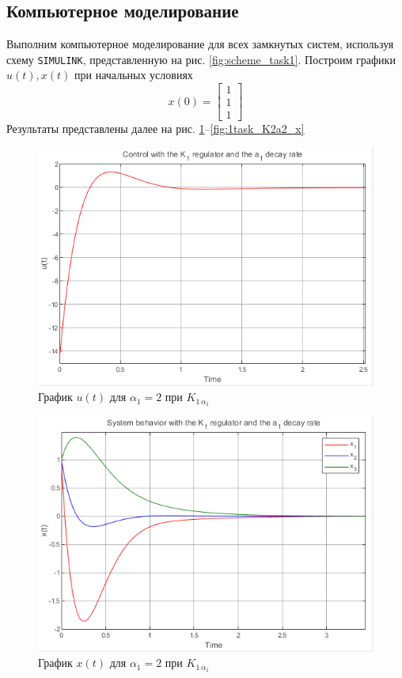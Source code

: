 \documentclass[a4paper, 12pt]{article}
\begin{document}
    \subsection{Компьютерное моделирование}
    Выполним компьютерное моделирование для всех замкнутых систем, используя схему \texttt{SIMULINK},
    представленную на рис. \ref{fig:scheme_task1}. Построим графики $u(t),x(t)$ при начальных условиях
    $$x(0)=\begin{bmatrix}
        1 \\1 \\1
    \end{bmatrix}$$
    Результаты представлены далее на рис. \ref{fig:1task_K1a1_u}--\ref{fig:1task_K2a2_x}
    \newpage
    \vspace*{0.01mm}
    \begin{figure}[H]
        \centering
        \includegraphics{1task_K1a1_u.png}
        \captionsetup{skip=0pt}
        \caption{График $u(t)$ для $\alpha_1=2$ при $K_{1\,\alpha_1}$}
        \label{fig:1task_K1a1_u}
    \end{figure}
    \begin{figure}[H]
        \centering
        \includegraphics{1task_K1a1_x.png}
        \captionsetup{skip=0pt}
        \caption{График $x(t)$ для $\alpha_1=2$ при $K_{1\,\alpha_1}$}
        \label{fig:1task_K1a1_x}
    \end{figure}
\end{document}
